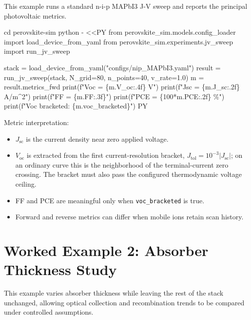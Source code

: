 \documentclass[
  11pt,
  american,
]{report}
\newenvironment{Shaded}{}{}
\newcommand{\AttributeTok}[1]{\textcolor[rgb]{0.49,0.56,0.16}{#1}}
\newcommand{\BuiltInTok}[1]{#1}
\newcommand{\ExtensionTok}[1]{#1}
\newcommand{\NormalTok}[1]{#1}
\newcommand{\OperatorTok}[1]{\textcolor[rgb]{0.40,0.40,0.40}{#1}}
\newcommand{\StringTok}[1]{\textcolor[rgb]{0.25,0.44,0.63}{#1}}
\providecommand{\tightlist}{%
  \setlength{\itemsep}{0pt}\setlength{\parskip}{0pt}}
\begin{document}
This example runs a standard n-i-p MAPbI3 J-V sweep and reports the
principal photovoltaic metrics.

\begin{Shaded}
\begin{Highlighting}[]
\BuiltInTok{cd}\NormalTok{ perovskite{-}sim}
\ExtensionTok{python} \AttributeTok{{-}} \OperatorTok{\textless{}\textless{}\textquotesingle{}PY\textquotesingle{}}
\StringTok{from perovskite\_sim.models.config\_loader import load\_device\_from\_yaml}
\StringTok{from perovskite\_sim.experiments.jv\_sweep import run\_jv\_sweep}

\StringTok{stack = load\_device\_from\_yaml("configs/nip\_MAPbI3.yaml")}
\StringTok{result = run\_jv\_sweep(stack, N\_grid=80, n\_points=40, v\_rate=1.0)}
\StringTok{m = result.metrics\_fwd}
\StringTok{print(f"Voc = \{m.V\_oc:.4f\} V")}
\StringTok{print(f"Jsc = \{m.J\_sc:.2f\} A/m\^{}2")}
\StringTok{print(f"FF  = \{m.FF:.3f\}")}
\StringTok{print(f"PCE = \{100*m.PCE:.2f\} \%")}
\StringTok{print(f"Voc bracketed: \{m.voc\_bracketed\}")}
\OperatorTok{PY}
\end{Highlighting}
\end{Shaded}

Metric interpretation:

\begin{itemize}
\tightlist
\item
  \(J_\mathrm{sc}\) is the current density near zero applied voltage.
\item
  \(V_\mathrm{oc}\) is extracted from the first current-resolution
  bracket, \(J_\mathrm{tol}=10^{-3}|J_\mathrm{sc}|\); on an ordinary
  curve this is the neighborhood of the terminal-current zero crossing.
  The bracket must also pass the configured thermodynamic voltage
  ceiling.
\item
  FF and PCE are meaningful only when \texttt{voc\_bracketed} is true.
\item
  Forward and reverse metrics can differ when mobile ions retain scan
  history.
\end{itemize}

\hypertarget{worked-example-2-absorber-thickness-study}{%
\section{Worked Example 2: Absorber Thickness
Study}\label{worked-example-2-absorber-thickness-study}}

This example varies absorber thickness while leaving the rest of the
stack unchanged, allowing optical collection and recombination trends to
be compared under controlled assumptions.
\end{document}
